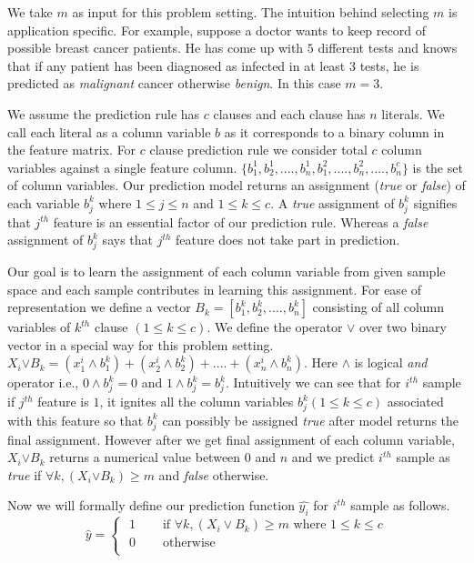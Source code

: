 	We take $ m $ as input for this  problem setting. The intuition behind selecting $ m $
	is application specific. For example, suppose a doctor wants to keep record of possible breast cancer patients. He has come up with $ 5 $ different tests and knows that if any patient has been diagnosed as infected in at least $ 3 $ tests, he is predicted as \textit{malignant} cancer otherwise  \textit{benign}. In  this case $ m=3 $. 
	
	We assume the prediction rule has $ c $ clauses and each clause has $ n $ literals. We call each literal as a column variable $ b $ as it  corresponds to a binary column in the feature matrix. For $ c $ clause prediction rule we consider total $ c $ column variables against a single feature column. $ \{b_1^1, b_2^1,...., b_n^1,b_1^2,....,b_n^2,....,b_n^c \} $ is the set of column variables.  Our prediction model returns an assignment (\textit{true} or \textit{false}) of each variable $ b_j^k $ where $ 1\le j \le n $ and $ 1 \le k \le c $. A \textit{true} assignment of $ b_j^k $ signifies that $ j^{th} $ feature is an essential factor of our prediction rule. Whereas a  \textit{false}  assignment of $ b_j^k $ says that $ j^{th} $ feature does not take part in prediction.   
	
	Our goal is to learn the assignment of each column variable from given sample space and each sample contributes in learning this assignment. For ease of representation we define a  vector $ B_k=[b_1^k, b_2^k,...., b_n^k] $  consisting of all column variables of $ k^{th} $ clause $ (1 \le k \le c) $. We define the operator $ \boldsymbol{\vee} $ over two binary vector in a special way for this problem setting. $ X_i \boldsymbol{\vee} B_k= (x_1^i \wedge b_1^k) + (x_2^i \wedge b_2^k) + .... +(x_n^i \wedge b_n^k)$. Here $ \wedge $ is logical \textit{and} operator i.e., $ 0 \wedge b_j^k=0 $ and $  1 \wedge b_j^k=b_j^k $.  Intuitively we can see that for $ i^{th} $ sample if $ j^{th} $ feature is $ 1 $, it ignites all the column variables $   b_j^k  (1\le k \le c) $ associated with this feature so that $ b_j^k $ can possibly be assigned \textit{true} after model returns the final assignment. However after we get final assignment of each column variable, $ X_i \boldsymbol{\vee} B_k $ returns a numerical value between $ 0 $ and $ n $ and we  predict $ i^{th} $ sample as \textit{true} if $ \forall k, (X_i \boldsymbol{\vee} B_k) \ge m $ and \textit{false} otherwise.
	
	Now we will formally define our prediction function $ \hat{y_i} $  for $ i^{th} $ sample as follows.
	\[
	\hat{y}=
	\begin{cases}
		\text{ 1 } & \quad\text{if }\forall k, ( X_i \vee B_k ) \ge m  \text{ where }  1\le k \le c\\
		\text{ 0 } &\quad\text{otherwise}\\
	\end{cases}		
	\]
	
